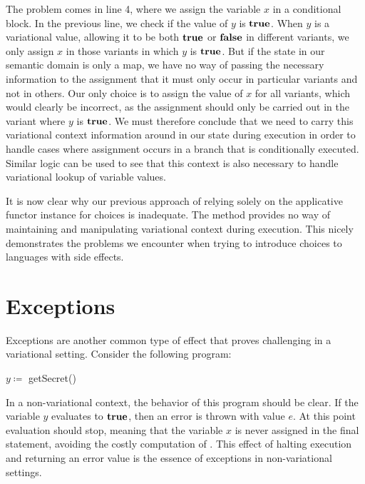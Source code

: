 \documentclass[12pt,oneside]{book}
\begin{document}
The problem comes in line 4, where we assign the variable $x$ in a conditional block. In the previous line, we check if the value of
$y$ is $\textbf{\textup{\textrm{true}}}$. When $y$ is a variational value, allowing it to be both $\textbf{\textup{\textrm{true}}}$ or $\textbf{\textup{\textrm{false}}}$ in different variants, we only assign $x$ in those variants
in which $y$ is $\textbf{\textup{\textrm{true}}}$. But if the state in our semantic domain is only a map, we have no way of passing the necessary information to the
assignment that it must only occur in particular variants and not in others. Our only choice is to assign the value of $x$ for all variants,
which would clearly be incorrect, as the assignment should only be carried out in the variant where $y$ is $\textbf{\textup{\textrm{true}}}$. We must therefore
conclude that we need to carry this variational context information around in our state during execution in order to handle cases where
assignment occurs in a branch that is conditionally executed. Similar logic can be used to see that this context is also necessary to handle
variational lookup of variable values.

It is now clear why our previous approach of relying solely on the applicative functor instance for choices is inadequate. The method provides
no way of maintaining and manipulating variational context during execution. This nicely demonstrates the problems we encounter when
trying to introduce choices to languages with side effects.

\section{Exceptions}
\label{sec:except}

Exceptions are another common type of effect that proves challenging in a variational setting.
Consider the following program:

\begin{samepage}
\begin{algorithmic}
\STATE $y \coloneqq$ getSecret()
\ENDIF
{}
\end{algorithmic}
\end{samepage}

In a non-variational context, the behavior of this program should be clear.
If the variable $y$ evaluates to $\textbf{\textup{\textrm{true}}}$, then an error is thrown with value
$e$. At this point evaluation should stop, meaning that the variable $x$ is never
assigned in the final statement, avoiding the costly computation of . This effect of halting execution and
returning an error value is the essence of exceptions in non-variational settings.
\end{document}
